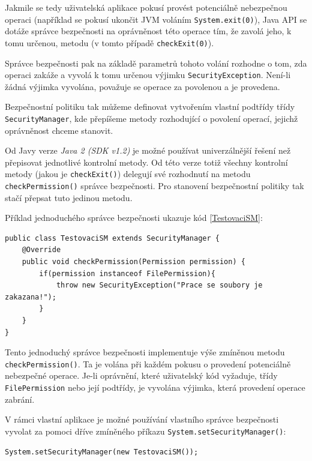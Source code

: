 Jakmile se tedy uživatelská aplikace pokusí provést potenciálně nebezpečnou operaci (například se pokusí ukončit JVM voláním {\tt System.exit(0)}),
Java API se dotáže správce bezpečnosti na oprávněnost této operace tím, že zavolá jeho, k tomu určenou, metodu (v tomto případě {\tt checkExit(0)}). \cite[4.1.1]{oaks}

Správce bezpečnosti pak na základě parametrů tohoto volání rozhodne o tom, zda operaci zakáže a vyvolá k tomu určenou výjimku {\tt SecurityException}.
Není-li žádná výjimka vyvolána, považuje se operace za povolenou a je provedena. \cite[4.1.1]{oaks}

Bezpečnostní politiku tak můžeme definovat vytvořením vlastní podtřídy třídy {\tt SecurityManager}, kde přepíšeme metody rozhodující o povolení
operací, jejichž oprávněnost chceme stanovit.

Od Javy verze {\it Java 2 (SDK v1.2)} je možné používat univerzálnější řešení než přepisovat jednotlivé kontrolní metody.
Od této verze totiž všechny kontrolní metody (jakou je {\tt checkExit()}) delegují své rozhodnutí na metodu {\tt checkPermission()} správce bezpečnosti.
Pro stanovení bezpečnostní politiky tak stačí přepsat tuto jedinou metodu. \cite{refSecurityManager}

Příklad jednoduchého správce bezpečnosti ukazuje kód \ref{TestovaciSM}:

\begin{lstlisting}[caption=Jednoduchý správce bezpečnosti, label=TestovaciSM]
public class TestovaciSM extends SecurityManager {
	@Override
	public void checkPermission(Permission permission) {
		if(permission instanceof FilePermission){
			throw new SecurityException("Prace se soubory je zakazana!");
		}
	}
}
\end{lstlisting}

Tento jednoduchý správce bezpečnosti implementuje výše zmíněnou metodu {\tt checkPermission()}.
Ta je volána při každém pokusu o provedení potenciálně nebezpečné operace.
Je-li oprávnění, které uživatelský kód vyžaduje, třídy {\tt FilePermission} nebo její podtřídy, je vyvolána výjimka, která provedení operace zabrání.

V rámci vlastní aplikace je možné používání vlastního správce bezpečnosti vyvolat za pomoci dříve zmíněného příkazu {\tt System.setSecurityManager()}:

\begin{lstlisting}[caption=Nastavení správce bezpečnosti zevnitř JVM, label=setSM]
System.setSecurityManager(new TestovaciSM());
\end{lstlisting}

